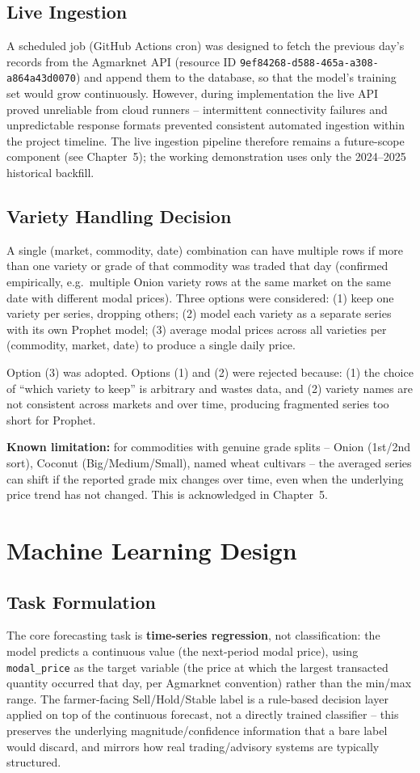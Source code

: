 \subsection{Live Ingestion}
A scheduled job (GitHub Actions cron) was designed to fetch the previous
day's records from the Agmarknet API (resource ID
\texttt{9ef84268-d588-465a-a308-a864a43d0070}) and append them to the
database, so that the model's training set would grow continuously.
However, during implementation the live API proved unreliable from cloud
runners -- intermittent connectivity failures and unpredictable response
formats prevented consistent automated ingestion within the project
timeline. The live ingestion pipeline therefore remains a future-scope
component (see Chapter~5); the working demonstration uses only the
2024--2025 historical backfill.

\subsection{Variety Handling Decision}
\label{sec:variety}
A single (market, commodity, date) combination can have multiple rows if
more than one variety or grade of that commodity was traded that day
(confirmed empirically, e.g.\ multiple Onion variety rows at the same
market on the same date with different modal prices). Three options were
considered: (1) keep one variety per series, dropping others; (2) model
each variety as a separate series with its own Prophet model; (3) average
modal prices across all varieties per (commodity, market, date) to
produce a single daily price.

Option (3) was adopted. Options (1) and (2) were rejected because: (1)
the choice of ``which variety to keep'' is arbitrary and wastes data, and
(2) variety names are not consistent across markets and over time,
producing fragmented series too short for Prophet.

\textbf{Known limitation:} for commodities with genuine grade
splits -- Onion (1st/2nd sort), Coconut (Big/Medium/Small), named wheat
cultivars -- the averaged series can shift if the reported grade mix
changes over time, even when the underlying price trend has not changed.
This is acknowledged in Chapter~5.

\section{Machine Learning Design}
\subsection{Task Formulation}
The core forecasting task is \textbf{time-series regression}, not
classification: the model predicts a continuous value (the next-period
modal price), using \texttt{modal\_price} as the target variable (the
price at which the largest transacted quantity occurred that day, per
Agmarknet convention) rather than the min/max range. The farmer-facing
Sell/Hold/Stable label is a rule-based decision layer applied on top of
the continuous forecast, not a directly trained classifier -- this
preserves the underlying magnitude/confidence information that a bare
label would discard, and mirrors how real trading/advisory systems are
typically structured.

